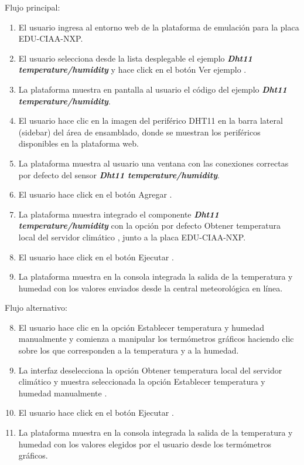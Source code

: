 Flujo principal:
\begin{enumerate}
	\item El usuario ingresa al entorno web de la plataforma de emulación para la placa EDU-CIAA-NXP.
	\item El usuario selecciona desde la lista desplegable el ejemplo \textit{\textbf{Dht11 temperature/humidity}} y hace click en el botón \textquotedbl Ver ejemplo \textquotedbl.
	\item La plataforma muestra en pantalla al usuario el código del ejemplo \textit{\textbf{Dht11 temperature/humidity}}.
	\item El usuario hace clic en la imagen del periférico DHT11 en la barra lateral (sidebar) del área de ensamblado, donde se muestran los periféricos disponibles en la plataforma web.
	\item La plataforma muestra al usuario una ventana con las conexiones correctas por defecto del sensor \textit{\textbf{Dht11 temperature/humidity}}.
	\item El usuario hace click en el botón \textquotedbl Agregar \textquotedbl.
	\item La plataforma muestra integrado el componente \textit{\textbf{Dht11 temperature/humidity}} con la opción por defecto \textquotedbl Obtener temperatura local del servidor climático \textquotedbl, junto a la placa EDU-CIAA-NXP.
	\item El usuario hace click en el botón \textquotedbl Ejecutar \textquotedbl.
	\item La plataforma muestra en la consola integrada la salida de la temperatura y humedad con los valores enviados desde la central meteorológica en línea.
\end{enumerate}

Flujo alternativo:
\begin{enumerate}
    \setcounter{enumi}{7}
	\item El usuario hace clic en la opción \textquotedbl Establecer temperatura y humedad manualmente \textquotedbl y comienza a manipular los termómetros gráficos haciendo clic sobre los que corresponden a la temperatura y a la humedad.
	\item La interfaz deselecciona la opción \textquotedbl Obtener temperatura local del servidor climático \textquotedbl y muestra seleccionada la opción \textquotedbl Establecer temperatura y humedad manualmente \textquotedbl.
	\item El usuario hace click en el botón \textquotedbl Ejecutar \textquotedbl.
	\item La plataforma muestra en la consola integrada la salida de la temperatura y humedad con los valores elegidos por el usuario desde los termómetros gráficos.
\end{enumerate}



